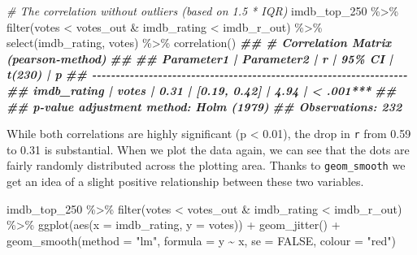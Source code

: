 \documentclass[
]{book}
\newenvironment{Shaded}{\begin{snugshade}}{\end{snugshade}}
\newcommand{\AttributeTok}[1]{\textcolor[rgb]{0.77,0.63,0.00}{#1}}
\newcommand{\CommentTok}[1]{\textcolor[rgb]{0.56,0.35,0.01}{\textit{#1}}}
\newcommand{\ConstantTok}[1]{\textcolor[rgb]{0.00,0.00,0.00}{#1}}
\newcommand{\DocumentationTok}[1]{\textcolor[rgb]{0.56,0.35,0.01}{\textbf{\textit{#1}}}}
\newcommand{\FunctionTok}[1]{\textcolor[rgb]{0.00,0.00,0.00}{#1}}
\newcommand{\NormalTok}[1]{#1}
\newcommand{\SpecialCharTok}[1]{\textcolor[rgb]{0.00,0.00,0.00}{#1}}
\newcommand{\StringTok}[1]{\textcolor[rgb]{0.31,0.60,0.02}{#1}}
\begin{document}
\begin{Shaded}
\begin{Highlighting}[]
\CommentTok{\# The correlation without outliers (based on 1.5 * IQR)}
\NormalTok{imdb\_top\_250 }\SpecialCharTok{\%\textgreater{}\%}
  \FunctionTok{filter}\NormalTok{(votes }\SpecialCharTok{\textless{}}\NormalTok{  votes\_out }\SpecialCharTok{\&}\NormalTok{ imdb\_rating }\SpecialCharTok{\textless{}}\NormalTok{ imdb\_r\_out) }\SpecialCharTok{\%\textgreater{}\%}
  \FunctionTok{select}\NormalTok{(imdb\_rating, votes) }\SpecialCharTok{\%\textgreater{}\%} 
  \FunctionTok{correlation}\NormalTok{()}
\DocumentationTok{\#\# \# Correlation Matrix (pearson{-}method)}
\DocumentationTok{\#\# }
\DocumentationTok{\#\# Parameter1  | Parameter2 |    r |       95\% CI | t(230) |         p}
\DocumentationTok{\#\# {-}{-}{-}{-}{-}{-}{-}{-}{-}{-}{-}{-}{-}{-}{-}{-}{-}{-}{-}{-}{-}{-}{-}{-}{-}{-}{-}{-}{-}{-}{-}{-}{-}{-}{-}{-}{-}{-}{-}{-}{-}{-}{-}{-}{-}{-}{-}{-}{-}{-}{-}{-}{-}{-}{-}{-}{-}{-}{-}{-}{-}{-}{-}{-}{-}{-}{-}}
\DocumentationTok{\#\# imdb\_rating |      votes | 0.31 | [0.19, 0.42] |   4.94 | \textless{} .001***}
\DocumentationTok{\#\# }
\DocumentationTok{\#\# p{-}value adjustment method: Holm (1979)}
\DocumentationTok{\#\# Observations: 232}
\end{Highlighting}
\end{Shaded}

While both correlations are highly significant (p \textless{} 0.01), the drop in \texttt{r} from 0.59 to 0.31 is substantial. When we plot the data again, we can see that the dots are fairly randomly distributed across the plotting area. Thanks to \texttt{geom\_smooth} we get an idea of a slight positive relationship between these two variables.

\begin{Shaded}
\begin{Highlighting}[]
\NormalTok{imdb\_top\_250 }\SpecialCharTok{\%\textgreater{}\%}
  \FunctionTok{filter}\NormalTok{(votes }\SpecialCharTok{\textless{}}\NormalTok{  votes\_out }\SpecialCharTok{\&}\NormalTok{ imdb\_rating }\SpecialCharTok{\textless{}}\NormalTok{ imdb\_r\_out) }\SpecialCharTok{\%\textgreater{}\%}
  \FunctionTok{ggplot}\NormalTok{(}\FunctionTok{aes}\NormalTok{(}\AttributeTok{x =}\NormalTok{ imdb\_rating, }\AttributeTok{y =}\NormalTok{ votes)) }\SpecialCharTok{+} 
  \FunctionTok{geom\_jitter}\NormalTok{() }\SpecialCharTok{+}
  \FunctionTok{geom\_smooth}\NormalTok{(}\AttributeTok{method =} \StringTok{"lm"}\NormalTok{,}
              \AttributeTok{formula =}\NormalTok{ y }\SpecialCharTok{\textasciitilde{}}\NormalTok{ x,}
              \AttributeTok{se =} \ConstantTok{FALSE}\NormalTok{,}
              \AttributeTok{colour =} \StringTok{"red"}\NormalTok{)}
\end{Highlighting}
\end{Shaded}
\end{document}
